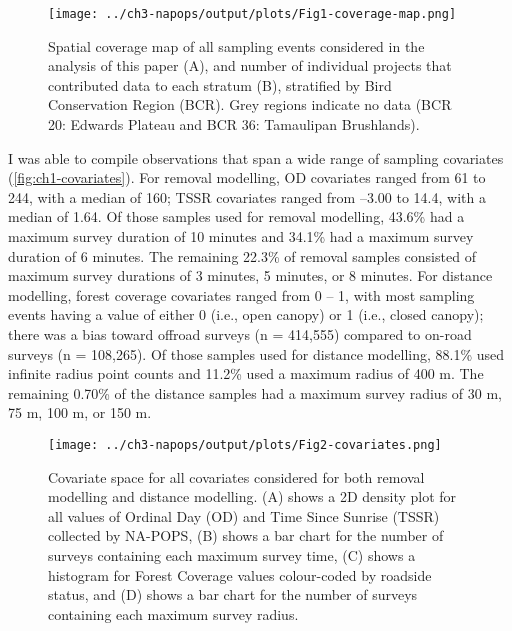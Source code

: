 \begin{figure}[h]
	\centering
	\texttt{[image: ../ch3-napops/output/plots/Fig1-coverage-map.png]}
	\caption{\label{fig:ch1-map}Spatial coverage map of all sampling events considered in the analysis of this paper (A), and number of individual projects that contributed data to each stratum (B), stratified by Bird Conservation Region (BCR). Grey regions indicate no data (BCR 20: Edwards Plateau and BCR 36: Tamaulipan Brushlands).}
\end{figure}

\par I was able to compile observations that span a wide range of sampling covariates (\autoref{fig:ch1-covariates}). For removal modelling, OD covariates ranged from 61 to 244, with a median of 160; TSSR covariates ranged from –3.00 to 14.4, with a median of 1.64. Of those samples used for removal modelling, 43.6\% had a maximum survey duration of 10 minutes and 34.1\% had a maximum survey duration of 6 minutes. The remaining 22.3\% of removal samples consisted of maximum survey durations of 3 minutes, 5 minutes, or 8 minutes. For distance modelling, forest coverage covariates ranged from 0 – 1, with most sampling events having a value of either 0 (i.e., open canopy) or 1 (i.e., closed canopy); there was a bias toward offroad surveys (n = 414,555) compared to on-road surveys (n = 108,265). Of those samples used for distance modelling, 88.1\% used infinite radius point counts and 11.2\% used a maximum radius of 400 m. The remaining 0.70\% of the distance samples had a maximum survey radius of 30 m, 75 m, 100 m, or 150 m.

\begin{figure}[h]
	\centering
	\texttt{[image: ../ch3-napops/output/plots/Fig2-covariates.png]}
	\caption{\label{fig:ch1-covariates}Covariate space for all covariates considered for both removal modelling and distance modelling. (A) shows a 2D density plot for all values of Ordinal Day (OD) and Time Since Sunrise (TSSR) collected by NA-POPS, (B) shows a bar chart for the number of surveys containing each maximum survey time, (C) shows a histogram for Forest Coverage values colour-coded by roadside status, and (D) shows a bar chart for the number of surveys containing each maximum survey radius.}
\end{figure}

